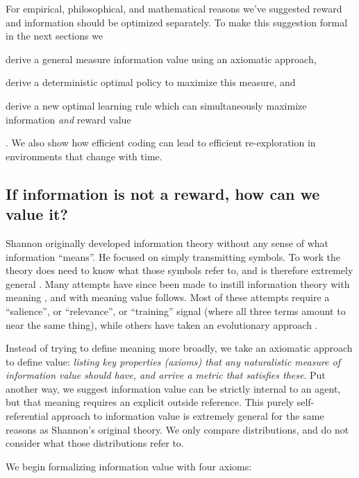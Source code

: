 \documentclass[9pt,twocolumn,twoside]{pnas-new}
\begin{document}
For empirical, philosophical, and mathematical reasons we've suggested reward and information should be optimized separately. To make this suggestion formal in the next sections we \begin{enumerate*} \item derive a general measure information value using an axiomatic approach, \item derive a deterministic optimal policy to maximize this measure, and \item derive a new optimal learning rule which can simultaneously maximize information \textit{and} reward value \end{enumerate*}. We also show how efficient coding can lead to efficient re-exploration in environments that change with time. 

    
\subsection*{If information is not a reward, how can we value it?}
Shannon originally developed information theory without any sense of what information ``means''. He focused on simply transmitting symbols. To work the theory does need to know what those symbols refer to, and is therefore extremely general \citep{Shannon1948}. Many attempts have since been made to instill information theory with meaning \citep{Kolchinsky2018}, and with meaning value follows. Most of these attempts require a ``salience'', or ``relevance'', or ``training'' signal (where all three terms amount to near the same thing), while others have taken an evolutionary approach \citep{Kolchinsky2018}.  

Instead of trying to define meaning more broadly, we take an axiomatic approach to define value: \textit{listing key properties (axioms) that any naturalistic measure of information value should have, and arrive a metric that satisfies these}. Put another way, we suggest information value can be strictly internal to an agent, but that meaning requires an explicit outside reference. This purely self-referential approach to information value is extremely general for the same reasons as Shannon's original theory. We only compare distributions, and do not consider what those distributions refer to.

We begin formalizing information value with four axioms:
\end{document}
